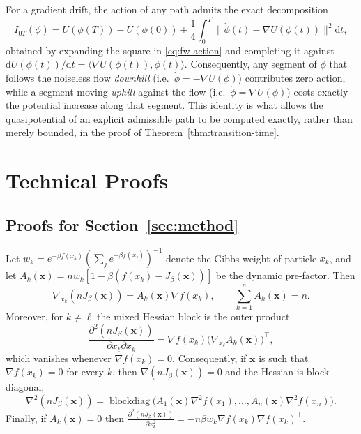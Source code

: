 \documentclass{opt2026} %
\newcommand{\dd}{\mathrm d}
\newcommand{\prefactor}[2]{A_{#1}(#2)}
\newcommand{\xx}{\mathbf{x}}
\begin{document}
For a gradient drift, the action of any path admits the exact decomposition
\begin{equation}
    I_{0T}(\phi) = U(\phi(T))-U(\phi(0)) + \frac14\int_0^T\bigl\|\dot\phi(t)-\nabla U(\phi(t))\bigr\|^2\dd t,
    \label{eq:gradient-decomposition}
\end{equation}
obtained by expanding the square in \eqref{eq:fw-action} and completing it against $\dd U(\phi(t))/\dd t = \langle\nabla U(\phi(t)),\dot\phi(t)\rangle$. Consequently, any segment of $\phi$ that follows the noiseless flow \emph{downhill} (i.e.\ $\dot\phi=-\nabla U(\phi)$) contributes zero action, while a segment moving \emph{uphill} against the flow (i.e.\ $\dot\phi=\nabla U(\phi)$) costs exactly the potential increase along that segment. This identity is what allows the quasipotential of an explicit admissible path to be computed exactly, rather than merely bounded, in the proof of Theorem~\ref{thm:transition-time}.

\section{Technical Proofs}
\label{apx:technical-proofs}

\subsection{Proofs for Section~\ref{sec:method}}

\begin{lemma}
    \label{lem:derivative-of-J-proof}
    Let $w_k = e^{-\beta f(x_k)}(\sum_j e^{-\beta f(x_j)})^{-1}$ denote the Gibbs weight of particle $x_k$, and let $\prefactor{k}{\xx} = nw_k\left[1 - \beta(f(x_k) - J_\beta(\xx))\right]$ be the dynamic pre-factor. Then
    \begin{equation}
        \nabla_{x_k} (nJ_\beta(\xx)) = \prefactor{k}{\xx} \nabla f(x_k),
        \qquad
        \sum_{k=1}^n \prefactor{k}{\xx} = n.
        \label{eq:lemma-gradient}
    \end{equation}
    Moreover, for $k \neq \ell$ the mixed Hessian block is the outer product
    \begin{equation}
        \frac{\partial^2 (nJ_\beta(\xx))}{\partial x_\ell \partial x_k} = \nabla f(x_k)\bigl(\nabla_{x_\ell}\prefactor{k}{\xx}\bigr)^\top,
        \label{eq:mixed-block}
    \end{equation}
    which vanishes whenever $\nabla f(x_k)=0$. Consequently, if $\xx$ is such that $\nabla f(x_k)=0$ for every $k$, then $\nabla(nJ_\beta(\xx))=0$ and the Hessian is block diagonal,
    \begin{equation}
        \nabla^2(nJ_\beta(\xx)) = \operatorname{blockdiag}\bigl(\prefactor{1}{\xx}\nabla^2 f(x_1),\dots,\prefactor{n}{\xx}\nabla^2 f(x_n)\bigr).
        \label{eq:block-diagonal-hessian}
    \end{equation}
    Finally, if $\prefactor{k}{\xx}=0$ then $\frac{\partial^2(nJ_\beta(\xx))}{\partial x_k^2} = -n\beta w_k \nabla f(x_k)\nabla f(x_k)^\top$.
\end{lemma}
\end{document}
